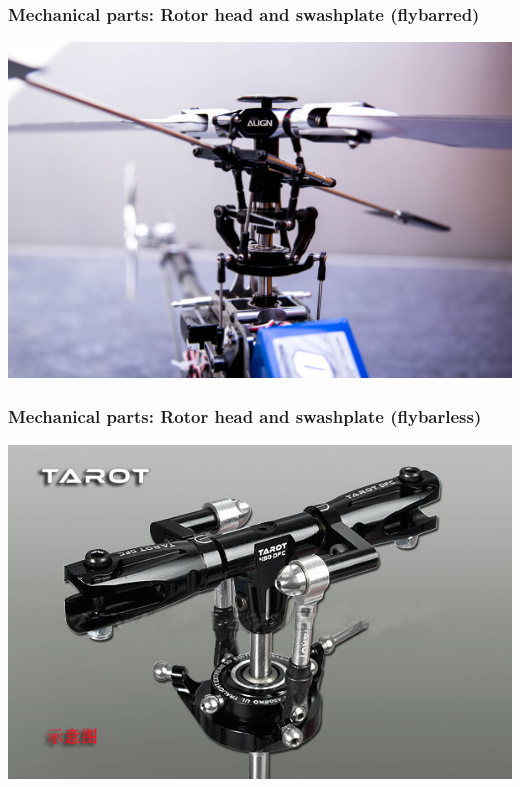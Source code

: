 \documentclass{beamer}
\begin{document}
\begin{frame}
\frametitle{Mechanical parts: Rotor head and swashplate (flybarred)}

\begin{center}
	\includegraphics[width=.9\textwidth]{images/IMG_0647_smaller}
\end{center}

\end{frame}

\begin{frame}
\frametitle{Mechanical parts: Rotor head and swashplate (flybarless)}

\begin{center}
	\includegraphics[width=.9\textwidth]{images/Tarot-DFC-FBL-head.jpg}
\end{center}

\end{frame}
\end{document}
